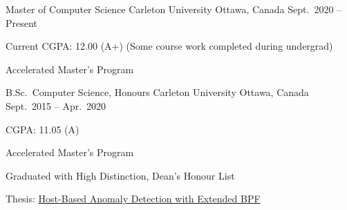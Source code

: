 

\begin{cventries}

  \cventry
    {Master of Computer Science} %
    {Carleton University} %
    {Ottawa, Canada} %
    {Sept.~2020 -- Present} %
    {
      \begin{cvitems} %
        \item {Current CGPA: 12.00 (A+) (Some course work completed during undergrad)}
        \item {Accelerated Master's Program}
      \end{cvitems}
    }

  \cventry
    {B.Sc.~Computer Science, Honours} %
    {Carleton University} %
    {Ottawa, Canada} %
    {Sept.~2015 -- Apr.~2020} %
    {
      \begin{cvitems} %
        \item {CGPA: 11.05 (A)}
        \item {Accelerated Master's Program}
        \item {Graduated with High Distinction, Dean's Honour List}
        \item {Thesis: \href{https://www.cisl.carleton.ca/~will/written/coursework/undergrad-ebpH-thesis.pdf}
          {Host-Based Anomaly Detection with Extended BPF}}
      \end{cvitems}
    }

\end{cventries}
